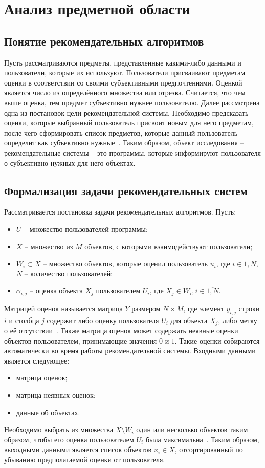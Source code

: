 \section{Анализ предметной области}

\subsection{Понятие рекомендательных алгоритмов}
Пусть рассматриваются предметы, представленные какими-либо данными и пользователи, которые их используют.
Пользователи присваивают предметам оценки в соответствии со своими субъективными предпочтениями.
Оценкой является число из определённого множества или отрезка.
Считается, что чем выше оценка, тем предмет субъективно нужнее пользователю.
Далее рассмотрена одна из постановок цели рекомендательной системы.
Необходимо предсказать оценки, которые выбранный пользователь присвоит новым для него предметам, после чего сформировать список предметов, которые данный пользователь определит как субъективно нужные~\cite{aggarwal}.
Таким образом, объект исследования -- рекомендательные системы -- это программы, которые информируют пользователя о субъективно нужных для него объектах.

\subsection[Формализация задачи рекомендательных\\систем]{Формализация задачи рекомендательных систем}
Рассматривается постановка задачи рекомендательных алгоритмов.
Пусть:
\begin{itemize}
    \item $U$ -- множество пользователей программы;
    \item $X$ -- множество из $M$ объектов, с которыми взаимодействуют пользователи;
    \item $W_i \subset X$ -- множество объектов, которые оценил пользователь $u_i$, где $i \in \overline{1, N}$, $N$ -- количество пользователей;
    \item $\alpha_{i,j}$ -- оценка объекта $X_j$ пользователем $U_i$, где $X_j \in W_i, i \in \overline{1, N}$.
\end{itemize}
Матрицей оценок называется матрица $Y$ размером $N \times M$, где элемент $y_{i,j}$ строки $i$ и столбца $j$ содержит либо оценку пользователя $U_i$ для объекта $X_j$, либо метку о её отсутствии~\cite{aggarwal}.
Также матрица оценок может содержать неявные оценки объектов пользователем, принимающие значения $0$ и $1$.
Такие оценки собираются автоматически во время работы рекомендательной системы.
Входными данными является следующее:
\begin{itemize}
    \item матрица оценок;
    \item матрица неявных оценок;
    \item данные об объектах.
\end{itemize}
Необходимо выбрать из множества $X \setminus W_i$ один или несколько объектов таким образом, чтобы его оценка пользователем $U_i$ была максимальна~\cite{aggarwal}.
Таким образом, выходными данными является список объектов $x_i \in X$, отсортированный по убыванию предполагаемой оценки от пользователя.